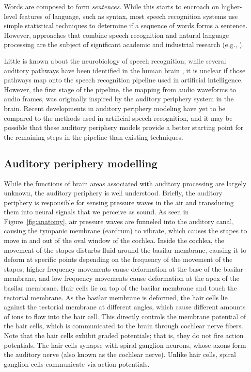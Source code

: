 \documentclass{article}
\begin{document}
Words are composed to form \textit{sentences}.
While this starts to encroach
on higher-level features of language,
such as syntax,
most speech recognition systems
use simple statistical techniques
to determine if a sequence of words
forms a sentence.
However, approaches that combine
speech recognition and natural language processing
are the subject of significant
academic and industrial research
(e.g., \citealp{sagae2009}).

Little is known about the neurobiology
of speech recognition;
while several auditory pathways have been identified
in the human brain \citep{scott2003},
it is unclear if those pathways map onto
the speech recognition pipeline
used in artificial intelligence.
However, the first stage of the pipeline,
the mapping from audio waveforms
to audio frames, was originally inspired
by the auditory periphery system
in the brain.
Recent developments in auditory periphery modeling
have yet to be compared to the methods used
in artificial speech recognition,
and it may be possible that
these auditory periphery models
provide a better starting point
for the remaining steps in the pipeline
than existing techniques.

\subsection{Auditory periphery modelling}
\label{subsec:periphery}

While the functions of brain areas
associated with auditory processing
are largely unknown,
the auditory periphery is well understood.
Briefly, the auditory periphery
is responsible for sensing pressure waves
in the air and transducing them into
neural signals that we perceive as sound.
As seen in Figure~\ref{fig:anatomy},
air pressure waves are funneled into the auditory canal,
causing the tympanic membrane (eardrum)
to vibrate, which causes the stapes
to move in and out of the oval window of the cochlea.
Inside the cochlea, the movement of the stapes
disturbs fluid around the basilar membrane,
causing it to deform at specific points
depending on the frequency of the movement
of the stapes; higher frequency movements
cause deformation at the base of the basilar membrane,
and low frequency movements cause deformation
at the apex of the basilar membrane.
Hair cells lie on top of the basilar membrane
and touch the tectorial membrane.
As the basilar membrane is deformed,
the hair cells lie against
the tectorial membrane at different angles,
which cause different amounts of ions
to flow into the hair cell.
This directly controls the membrane potential
of the hair cells,
which is communicated
to the brain through cochlear nerve fibers.
Note that the hair cells exhibit graded potentials;
that is, they do not fire action potentials.
The hair cells synapse with spiral ganglion neurons,
whose axons form the auditory nerve
(also known as the cochlear nerve).
Unlike hair cells, spiral ganglion cells
communicate via action potentials.
\end{document}
